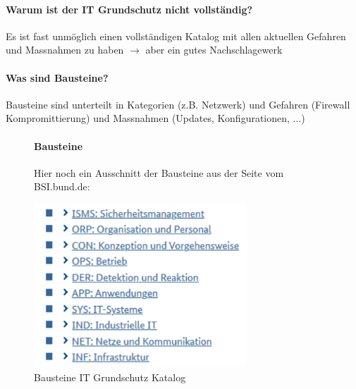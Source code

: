 \documentclass[10pt,a4paper]{article}
\begin{document}
\paragraph*{Warum ist der IT Grundschutz nicht vollständig?}Es ist fast unmöglich einen vollständigen Katalog mit allen aktuellen Gefahren und Massnahmen zu haben $\rightarrow$ aber ein gutes Nachschlagewerk

\paragraph*{Was sind Bausteine?}Bausteine sind unterteilt in Kategorien (z.B. Netzwerk) und Gefahren (Firewall Kompromittierung) und Massnahmen (Updates, Konfigurationen, ...)

\begin{figure}[H]
\paragraph*{Bausteine}Hier noch ein Ausschnitt der Bausteine aus der Seite vom BSI.bund.de:
    \begin{center}
    \includegraphics[width=8cm]{images/Bausteine.png}
    \caption{Bausteine IT Grundschutz Katalog}
    \label{Bausteine IT Grundschutz Katalog}
    \end{center}
\end{figure}
\end{document}
